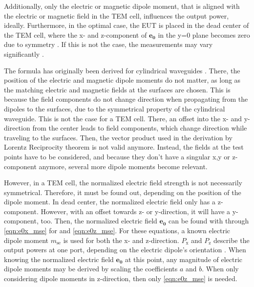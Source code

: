 Additionally, only the electric or magnetic dipole moment, that is aligned with the electric or magnetic field in the TEM cell, influences the output power, ideally. 
Furthermore, in the optimal case, the EUT is placed in the dead center of the TEM cell, where the x- and z-component of $\mathbf{e_0}$ in the y=0 plane becomes zero due to symmetry \cite{Sreenivasiah_Chang_Ma_1981}. If this is not the case, the measurements may vary significantly \cite{Kreindl_Bauernfeind_Weiss_Stockreiter_Yenumula_Narayanan_Kaltenbacher_2022}.

The formula has originally been derived for cylindrical waveguides \cite{Collin_2015}. There, the position of the electric and magnetic dipole moments do not matter, as long as the matching electric and magnetic fields at the surfaces are chosen. This is because the field components do not change direction when propagating from the dipoles to the surfaces, due to the symmetrical property of the cylindrical waveguide. This is not the case for a TEM cell. There, an offset into the x- and y-direction from the center leads to field components, which change direction while traveling to the surfaces. Then, the vector product used in the derivation by Lorentz Reciprocity theorem is not valid anymore. Instead, the fields at the test points have to be considered, and because they don't have a singular x,y or z-component anymore, several more dipole moments become relevant.

However, in a TEM cell, the normalized electric field strength is not necessarily symmetrical. Therefore, it must be found out, depending on the position of the dipole moment. In dead center, the normalized electric field only has a z-component. However, with an offset towards z- or y-direction, it will have a y-component, too. Then, the normalized electric field $\mathbf{e_0}$ can be found with through \autoref{eqn:e0x_mse} for  and \autoref{eqn:e0z_mse}. For these equations, a known electric dipole moment $m_{\mathrm{se}}$ is used for both the x- and z-direction. $P_\mathrm{x}$ and $P_\mathrm{z}$ describe the output powers at one port, depending on the electric dipole's orientation \cite{Sreenivasiah_Chang_Ma_1981}. When knowing the normalized electric field $\mathbf{e_0}$ at this point, any magnitude of electric dipole moments may be derived by scaling the coefficients $a$ and $b$. When only considering dipole moments in z-direction, then only \autoref{eqn:e0z_mse} is needed.

